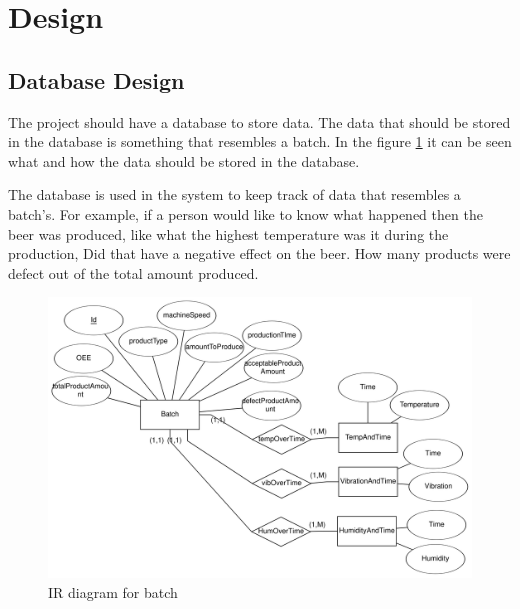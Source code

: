 \section{Design}

\subsection{Database Design}
The project should have a database to store data. 
The data that should be stored in the database is something that 
resembles a batch. In the figure \ref{figure:eer_diagram_batch} it can be seen
what and how the data should be stored in the database.

The database is used in the system to keep track of data that resembles a batch's.
For example, if a person would like to know what happened then the beer was produced,
like what the highest temperature was it during the production, Did that have a
negative effect on the beer.
How many products were defect out of the total amount produced. 

\begin{figure}[ht]
\centering 
\includegraphics[width=0.8\linewidth]{images/eer_diagrams/database_EER_batch.png}
\caption{IR diagram for batch} 
\label{figure:eer_diagram_batch}
\end{figure}
